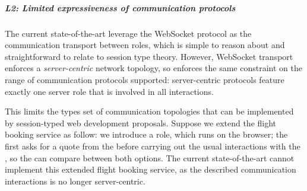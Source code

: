 \subparagraph{L2: 
Limited expressiveness of communication protocols}

The current state-of-the-art leverage the WebSocket protocol
as the communication transport between roles, which is
simple to reason about and straightforward to relate
to session type theory.
However, WebSocket transport enforces a \emph{server-centric}
network topology, so \cite{PureScript2019,MVU2020}
enforces the same constraint on the range of communication
protocols supported:
server-centric protocols feature exactly one server
role that is involved in all interactions. 

This limits the types set of communication topologies
that can be implemented by session-typed web development
proposals. 
Suppose we extend the flight booking service as follow:
we introduce a  role, which
runs on the browser; the  first asks
for a quote from the  before 
carrying out the usual interactions with the ,
so the  can compare between both options.
The current state-of-the-art cannot implement this 
extended flight booking service, as the described
communication interactions is no longer server-centric.